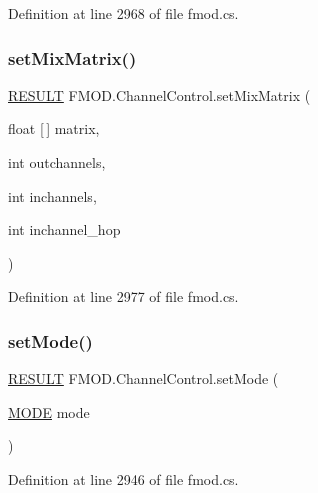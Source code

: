 Definition at line 2968 of file fmod.\+cs.

\mbox{\label{class_f_m_o_d_1_1_channel_control_af65b7226fdce56ef5cba5ca3aa3f0231}} 
\subsubsection{\texorpdfstring{set\+Mix\+Matrix()}{setMixMatrix()}}
{\footnotesize\ttfamily \hyperlink{namespace_f_m_o_d_a305d1176ef3f8c8815861a60407ac33d}{R\+E\+S\+U\+LT} F\+M\+O\+D.\+Channel\+Control.\+set\+Mix\+Matrix (\begin{DoxyParamCaption}\item[{float \mbox{[}$\,$\mbox{]}}]{matrix,  }\item[{int}]{outchannels,  }\item[{int}]{inchannels,  }\item[{int}]{inchannel\+\_\+hop }\end{DoxyParamCaption})}



Definition at line 2977 of file fmod.\+cs.

\mbox{\label{class_f_m_o_d_1_1_channel_control_af7b48a996c84722bcdc4c6210ced099f}} 
\subsubsection{\texorpdfstring{set\+Mode()}{setMode()}}
{\footnotesize\ttfamily \hyperlink{namespace_f_m_o_d_a305d1176ef3f8c8815861a60407ac33d}{R\+E\+S\+U\+LT} F\+M\+O\+D.\+Channel\+Control.\+set\+Mode (\begin{DoxyParamCaption}\item[{\hyperlink{namespace_f_m_o_d_a94ab158a8314f5f4248f1aea55dbefa3}{M\+O\+DE}}]{mode }\end{DoxyParamCaption})}



Definition at line 2946 of file fmod.\+cs.

\mbox{\label{class_f_m_o_d_1_1_channel_control_aebb5efb0f2405dbbc79047d4637a1fb2}} 
